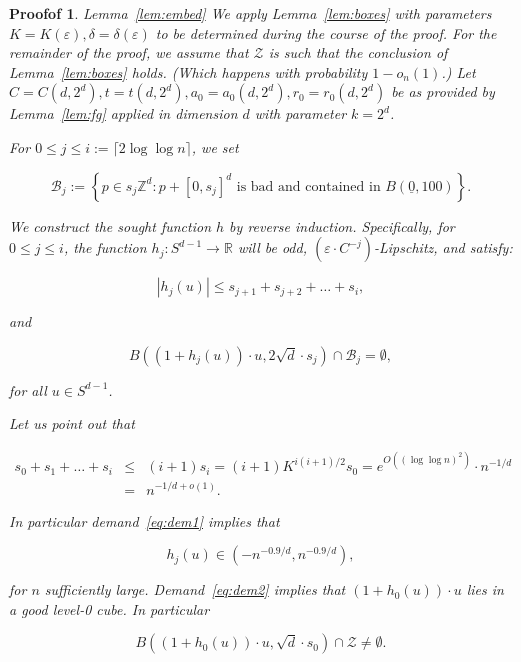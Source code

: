 \documentclass[10pt,a4paper]{amsart}
\newtheorem{proofof}{Proofof}
\newcommand{\Bcal}[0]{\ensuremath{{\mathcal B}}}
\newcommand{\Zcal}[0]{\ensuremath{{\mathcal Z}}}
\newcommand{\Zed}[0]{\ensuremath{ \mathbb Z}}
\newcommand{\eR}[0]{\ensuremath{ \mathbb R}}
\newcommand{\eps}{\varepsilon}
\newcommand{\orig}{\underline{0}}
\begin{document}
\begin{proofof}{Lemma~\ref{lem:embed}}
We apply Lemma~\ref{lem:boxes} with parameters $K=K(\eps), \delta=\delta(\eps)$ to be determined 
during the course of the proof. 
For the remainder of the proof, we assume that $\Zcal$ is such that 
the conclusion of Lemma~\ref{lem:boxes} holds. (Which happens with probability $1-o_n(1)$.)
Let $C=C(d,2^d), t=t(d,2^d), a_0=a_0(d,2^d), r_0=r_0(d,2^d)$ be as provided by Lemma~\ref{lem:fg}
applied in dimension $d$ with parameter $k=2^d$.

For $0 \leq j \leq i := \lceil 2\log\log n \rceil$, we set

$$ \Bcal_j := 
\left\{  p \in s_j\Zed^d : \text{$p+[0,s_j]^d$ is bad and contained  in $B(\orig,100)$}\right\}. $$

We construct the sought function $h$ by reverse induction.
Specifically, for $0 \leq j \leq i$, the function $h_j : S^{d-1} \to \eR$ 
will be odd, $(\eps \cdot C^{-j})$-Lipschitz, and satisfy: 

\begin{equation}\label{eq:dem1} 
|h_j(u)| \leq s_{j+1} + s_{j+2} + \dots + s_i, 
\end{equation}

\noindent
and

\begin{equation}\label{eq:dem2} 
B\left( (1+h_j(u))\cdot u, 2\sqrt{d}\cdot s_j \right) \cap \Bcal_j = \emptyset, 
\end{equation}

\noindent
for all $u \in S^{d-1}$.

\noindent
Let us point out that

\begin{equation}\label{eq:sums} 
\begin{array}{rcl}
s_0 + s_1 + \dots + s_i 
& \leq & (i+1)s_i = (i+1) K^{i(i+1)/2} s_0 = e^{O\left( (\log\log n)^2 \right)} \cdot n^{-1/d} \\
& = & 
n^{-1/d+o(1)}. 
\end{array} 
\end{equation}

\noindent
In particular demand~\eqref{eq:dem1} implies that 

$$ h_j(u) \in \left(-n^{-0.9/d},n^{-0.9/d}\right), $$

\noindent
for $n$ sufficiently large. 
Demand~\eqref{eq:dem2} implies that $(1+h_0(u)) \cdot u$ lies in a 
good level-0 cube. In particular 

$$ B( (1+h_0(u))\cdot u, \sqrt{d} \cdot s_0 ) \cap \Zcal \neq \emptyset. $$


\end{proofof}
\end{document}

